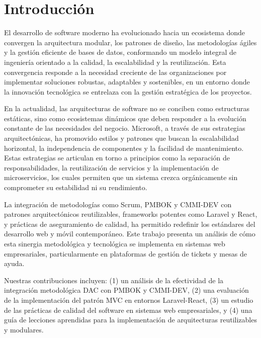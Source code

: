 \section{Introducción}

El desarrollo de software moderno ha evolucionado hacia un ecosistema donde convergen la arquitectura modular, los patrones de diseño, las metodologías ágiles y la gestión eficiente de bases de datos, conformando un modelo integral de ingeniería orientado a la calidad, la escalabilidad y la reutilización. Esta convergencia responde a la necesidad creciente de las organizaciones por implementar soluciones robustas, adaptables y sostenibles, en un entorno donde la innovación tecnológica se entrelaza con la gestión estratégica de los proyectos.

En la actualidad, las arquitecturas de software no se conciben como estructuras estáticas, sino como ecosistemas dinámicos que deben responder a la evolución constante de las necesidades del negocio. Microsoft, a través de sus estrategias arquitectónicas, ha promovido estilos y patrones que buscan la escalabilidad horizontal, la independencia de componentes y la facilidad de mantenimiento. Estas estrategias se articulan en torno a principios como la separación de responsabilidades, la reutilización de servicios y la implementación de microservicios, los cuales permiten que un sistema crezca orgánicamente sin comprometer su estabilidad ni su rendimiento.

La integración de metodologías como Scrum, PMBOK y CMMI-DEV con patrones arquitectónicos reutilizables, frameworks potentes como Laravel y React, y prácticas de aseguramiento de calidad, ha permitido redefinir los estándares del desarrollo web y móvil contemporáneo. Este trabajo presenta un análisis de cómo esta sinergia metodológica y tecnológica se implementa en sistemas web empresariales, particularmente en plataformas de gestión de tickets y mesas de ayuda.

Nuestras contribuciones incluyen: (1) un análisis de la efectividad de la integración metodológica DAC con PMBOK y CMMI-DEV, (2) una evaluación de la implementación del patrón MVC en entornos Laravel-React, (3) un estudio de las prácticas de calidad del software en sistemas web empresariales, y (4) una guía de lecciones aprendidas para la implementación de arquitecturas reutilizables y modulares.